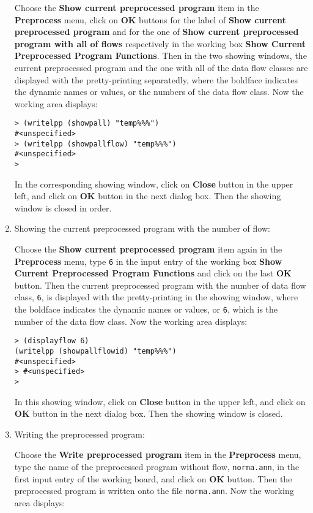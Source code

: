 \begin{sloppypar}
\begin{enumerate}
   Choose the {\bf Show current preprocessed program} item in the {\bf
Preprocess} menu, click on {\bf OK} buttons for the label of {\bf Show
current preprocessed program} and for the one of {\bf Show current
preprocessed program with all of flows} respectively in the working
box {\bf Show Current Preprocessed Program Functions}. Then in the two
showing windows, the current preprocessed program and the one with all
of the data flow classes are displayed with the pretty-printing
separatedly, where the boldface indicates the dynamic names or values,
or the numbers of the data flow class. Now the working area displays:

\begin{verbatim}
> (writelpp (showpall) "temp%%%")
#<unspecified>
> (writelpp (showpallflow) "temp%%%")
#<unspecified>
>
\end{verbatim}

   In the corresponding showing window, click on {\bf Close} button in
the upper left, and click on {\bf OK} button in the next dialog
box. Then the showing window is closed in order.

\item Showing the current preprocessed program with the number of flow:

   Choose the {\bf Show current preprocessed program} item again in
the {\bf Preprocess} menu, type {\tt 6} in the input entry of the
working box {\bf Show Current Preprocessed Program Functions} and
click on the last {\bf OK} button. Then the current preprocessed
program with the number of data flow class, {\tt 6}, is displayed with
the pretty-printing in the showing window, where the boldface
indicates the dynamic names or values, or {\tt 6}, which is the number
of the data flow class. Now the working area displays:

\begin{verbatim}
> (displayflow 6)
(writelpp (showpallflowid) "temp%%%")
#<unspecified>
> #<unspecified>
>
\end{verbatim}

    In this showing window, click on {\bf Close} button in the upper
left, and click on {\bf OK} button in the next dialog box. Then the
showing window is closed.

\item Writing the preprocessed program:

    Choose the {\bf Write preprocessed program} item in the {\bf
Preprocess} menu, type the name of the preprocessed program without
flow, {\tt norma.ann}, in the first input entry of the working board,
and click on {\bf OK} button. Then the preprocessed program is written
onto the file {\tt norma.ann}. Now the working area displays:


\end{enumerate}
\end{sloppypar}
